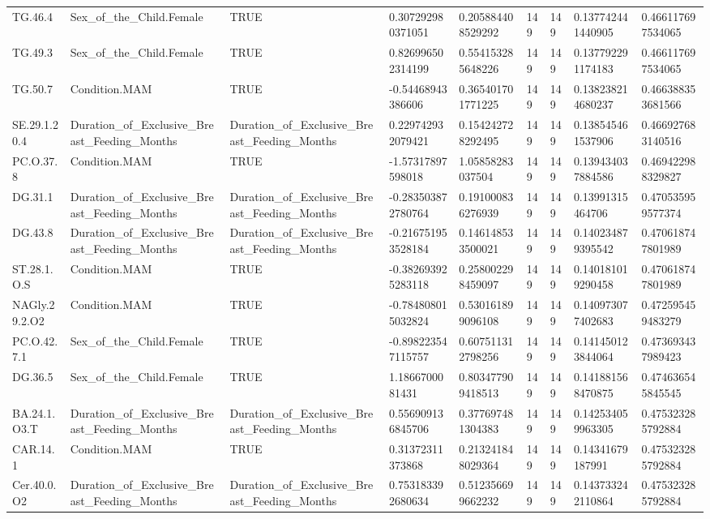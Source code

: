 \begin{longtable}{lllllllll}
TG.46.4 & Sex\_of\_the\_Child.Female & TRUE & 0.307292980371051 & 0.205884408529292 & 149 & 149 & 0.137742441440905 & 0.466117697534065 \\
TG.49.3 & Sex\_of\_the\_Child.Female & TRUE & 0.826996502314199 & 0.554153285648226 & 149 & 149 & 0.137792291174183 & 0.466117697534065 \\
TG.50.7 & Condition.MAM & TRUE & -0.54468943386606 & 0.365401701771225 & 149 & 149 & 0.138238214680237 & 0.466388353681566 \\
SE.29.1.20.4 & Duration\_of\_Exclusive\_Breast\_Feeding\_Months & Duration\_of\_Exclusive\_Breast\_Feeding\_Months & 0.229742932079421 & 0.154242728292495 & 149 & 149 & 0.138545461537906 & 0.466927683140516 \\
PC.O.37.8 & Condition.MAM & TRUE & -1.57317897598018 & 1.05858283037504 & 149 & 149 & 0.139434037884586 & 0.469422988329827 \\
DG.31.1 & Duration\_of\_Exclusive\_Breast\_Feeding\_Months & Duration\_of\_Exclusive\_Breast\_Feeding\_Months & -0.283503872780764 & 0.191000836276939 & 149 & 149 & 0.13991315464706 & 0.470535959577374 \\
DG.43.8 & Duration\_of\_Exclusive\_Breast\_Feeding\_Months & Duration\_of\_Exclusive\_Breast\_Feeding\_Months & -0.216751953528184 & 0.146148533500021 & 149 & 149 & 0.140234879395542 & 0.470618747801989 \\
ST.28.1.O.S & Condition.MAM & TRUE & -0.382693925283118 & 0.258002298459097 & 149 & 149 & 0.140181019290458 & 0.470618747801989 \\
NAGly.29.2.O2 & Condition.MAM & TRUE & -0.784808015032824 & 0.530161899096108 & 149 & 149 & 0.140973077402683 & 0.472595459483279 \\
PC.O.42.7.1 & Sex\_of\_the\_Child.Female & TRUE & -0.898223547115757 & 0.607511312798256 & 149 & 149 & 0.141450123844064 & 0.473693437989423 \\
DG.36.5 & Sex\_of\_the\_Child.Female & TRUE & 1.1866700081431 & 0.803477909418513 & 149 & 149 & 0.141881568470875 & 0.474636545845545 \\
BA.24.1.O3.T & Duration\_of\_Exclusive\_Breast\_Feeding\_Months & Duration\_of\_Exclusive\_Breast\_Feeding\_Months & 0.556909136845706 & 0.377697481304383 & 149 & 149 & 0.142534059963305 & 0.475323285792884 \\
CAR.14.1 & Condition.MAM & TRUE & 0.31372311373868 & 0.213241848029364 & 149 & 149 & 0.14341679187991 & 0.475323285792884 \\
Cer.40.0.O2 & Duration\_of\_Exclusive\_Breast\_Feeding\_Months & Duration\_of\_Exclusive\_Breast\_Feeding\_Months & 0.753183392680634 & 0.512356699662232 & 149 & 149 & 0.143733242110864 & 0.475323285792884 \\

\end{longtable}
